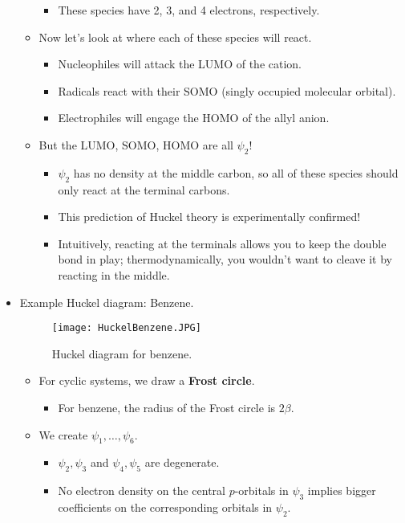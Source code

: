 \documentclass[../notes.tex]{subfiles}
\begin{document}
\begin{itemize}
\begin{itemize}
\begin{itemize}
            \item These species have 2, 3, and 4 electrons, respectively.
        \end{itemize}
        \item Now let's look at where each of these species will react.
        \begin{itemize}
            \item Nucleophiles will attack the LUMO of the cation.
            \item Radicals react with their SOMO (singly occupied molecular orbital).
            \item Electrophiles will engage the HOMO of the allyl anion.
        \end{itemize}
        \item But the LUMO, SOMO, HOMO are all $\psi_2$!
        \begin{itemize}
            \item $\psi_2$ has no density at the middle carbon, so all of these species should only react at the terminal carbons.
            \item This prediction of Huckel theory is experimentally confirmed!
            \item Intuitively, reacting at the terminals allows you to keep the double bond in play; thermodynamically, you wouldn't want to cleave it by reacting in the middle.
        \end{itemize}
    \end{itemize}
    \item Example Huckel diagram: Benzene.
    \begin{figure}[h!]
        \centering
        \texttt{[image: HuckelBenzene.JPG]}
        \caption{Huckel diagram for benzene.}
        \label{fig:HuckelBenzene}
    \end{figure}
    \begin{itemize}
        \item For cyclic systems, we draw a \textbf{Frost circle}.
        \begin{itemize}
            \item For benzene, the radius of the Frost circle is $2\beta$.
        \end{itemize}
        \item We create $\psi_1,\dots,\psi_6$.
        \begin{itemize}
            \item $\psi_2,\psi_3$ and $\psi_4,\psi_5$ are degenerate.
            \item No electron density on the central $p$-orbitals in $\psi_3$ implies bigger coefficients on the corresponding orbitals in $\psi_2$.

\end{itemize}
\end{itemize}
\end{itemize}
\end{document}
